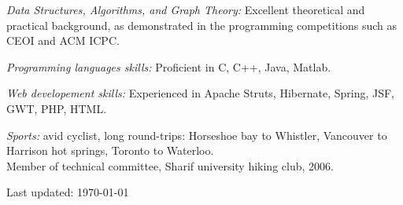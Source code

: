 \documentclass[10pt,letterpaper]{article}
\def\footerlink{}
\renewenvironment{itemize}{
  \begin{list}{}{
    \setlength{\leftmargin}{1.5em}
  }
}{
  \end{list}
}
\begin{document}
\begin{itemize}
\item \textit{Data Structures, Algorithms, and Graph Theory:}
  Excellent theoretical and practical background, as demonstrated in
  the programming competitions such as CEOI and ACM ICPC.
\item \textit{Programming languages skills:} Proficient in C, C++,
  Java, Matlab.
\item \textit{Web developement skills:} Experienced in Apache Struts,
  Hibernate, Spring, JSF, GWT, PHP, HTML.

\item \textit{Sports:} avid cyclist, long round-trips:
  Horseshoe bay to Whistler, Vancouver to Harrison hot springs,
  Toronto to Waterloo.\\ Member of technical committee, Sharif university hiking club, 2006.
\end{itemize}



\bigskip

\begin{center}
  \begin{footnotesize}
    Last updated: \today \\
    \href{\footerlink}{\texttt{\footerlink}}
  \end{footnotesize}
\end{center}
\end{document}
